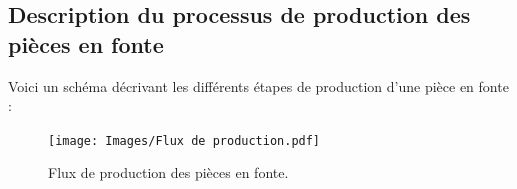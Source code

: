 \documentclass[12pt]{article}
\begin{document}
\newpage

\subsection{Description du processus de production des pièces en fonte}

Voici un schéma décrivant les différents étapes de production d'une pièce en fonte :


% 

\begin{figure}[H]
    \centering
    \begin{adjustbox}{width=1.3\textwidth,height=0.8\textheight,center}
        \texttt{[image: Images/Flux de production.pdf]}
    \end{adjustbox}
    \caption{Flux de production des pièces en fonte.}
    \label{fig:flux-production}
\end{figure}
\end{document}
